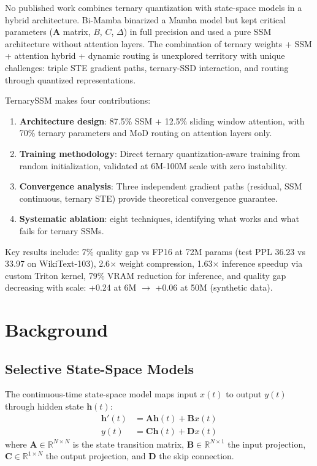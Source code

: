 \documentclass{article}
\begin{document}
No published work combines ternary quantization with state-space models in a hybrid architecture. Bi-Mamba \citep{bimamba2024} binarized a Mamba model but kept critical parameters ($\mathbf{A}$ matrix, $B$, $C$, $\Delta$) in full precision and used a pure SSM architecture without attention layers. The combination of ternary weights + SSM + attention hybrid + dynamic routing is unexplored territory with unique challenges: triple STE gradient paths, ternary-SSD interaction, and routing through quantized representations.

TernarySSM makes four contributions:
\begin{enumerate}
    \item \textbf{Architecture design}: 87.5\% SSM + 12.5\% sliding window attention, with 70\% ternary parameters and MoD routing on attention layers only.
    \item \textbf{Training methodology}: Direct ternary quantization-aware training from random initialization, validated at 6M-100M scale with zero instability.
    \item \textbf{Convergence analysis}: Three independent gradient paths (residual, SSM continuous, ternary STE) provide theoretical convergence guarantee.
    \item \textbf{Systematic ablation}: eight techniques, identifying what works and what fails for ternary SSMs.
\end{enumerate}

Key results include: 7\% quality gap vs FP16 at 72M params (test PPL 36.23 vs 33.97 on WikiText-103), 2.6$\times$ weight compression, 1.63$\times$ inference speedup via custom Triton kernel, 79\% VRAM reduction for inference, and quality gap decreasing with scale: +0.24 at 6M $\to$ +0.06 at 50M (synthetic data).

\section{Background}

\subsection{Selective State-Space Models}

The continuous-time state-space model maps input $x(t)$ to output $y(t)$ through hidden state $\mathbf{h}(t)$:
\begin{align}
\mathbf{h}'(t) &= \mathbf{A} \mathbf{h}(t) + \mathbf{B} x(t) \\
y(t) &= \mathbf{C} \mathbf{h}(t) + \mathbf{D} x(t)
\end{align}
where $\mathbf{A} \in \mathbb{R}^{N \times N}$ is the state transition matrix, $\mathbf{B} \in \mathbb{R}^{N \times 1}$ the input projection, $\mathbf{C} \in \mathbb{R}^{1 \times N}$ the output projection, and $\mathbf{D}$ the skip connection.
\end{document}

